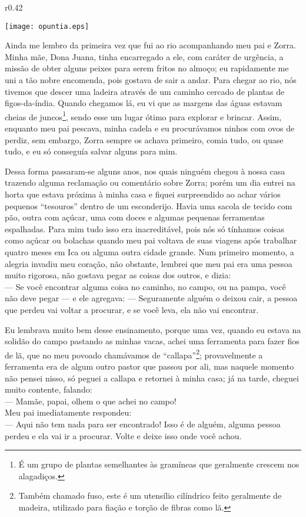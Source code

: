 \ifdefined\EnableIncludeImages
\begin{wrapfigure}{r}{0.42\textwidth}
  \begin{center}
  \vspace{-30pt}
    \texttt{[image: opuntia.eps]}
  \end{center}
  \vspace{-20pt}
\end{wrapfigure}
\fi
Ainda me lembro da primeira vez que fui ao rio acompanhando meu pai e Zorra. Minha mãe, Dona Juana, tinha encarregado a ele, com caráter de urgência, a missão de obter alguns peixes para serem fritos no almoço; eu rapidamente me uni a tão nobre encomenda, pois gostava de sair a andar. 
Para chegar ao rio, nós tivemos que descer uma ladeira através de um caminho cercado de plantas de figos-da-índia. Quando chegamos lá, eu vi que as margens das águas estavam cheias de juncos\footnote{É um grupo de plantas semelhantes às gramíneas que geralmente crescem nos alagadiços.}, sendo esse um lugar ótimo para explorar e brincar. Assim, enquanto meu pai pescava, minha cadela e eu procurávamos ninhos com ovos de perdiz, sem embargo, Zorra sempre os achava primeiro, comia tudo, ou quase tudo, e eu só conseguía salvar alguns para mim.


Dessa forma passaram-se alguns anos, nos quais ninguém chegou à nossa casa trazendo alguma reclamação ou comentário sobre Zorra; porém um dia entrei na horta que estava próxima à minha casa e fiquei surpreendido ao achar vários pequenos ``tesouros'' dentro de um esconderijo. Havia uma sacola de tecido com pão, outra com açúcar, uma com doces e algumas pequenas ferramentas espalhadas. 
Para mim tudo isso era inacreditável, pois nós só tínhamos coisas como açúcar ou bolachas quando meu pai voltava de suas viagens após trabalhar quatro meses em Ica ou alguma outra cidade grande.
Num primeiro momento, a alegria invadiu meu coração, não obstante, lembrei que meu pai era uma pessoa muito rigorosa, não gostava pegar as coisas dos outros, e dizia:\\\indent
--- Se você encontrar alguma coisa no caminho, no campo, ou na pampa, você não deve pegar ---
e ele agregava:
--- Seguramente alguém o deixou cair, a pessoa que perdeu vai voltar a procurar, e se você leva, ela não vai encontrar.

Eu lembrava muito bem desse ensinamento, porque uma vez, quando eu estava na solidão do campo pastando as minhas vacas, achei uma ferramenta para fazer fios de lã, que no meu povoado chamávamos de ``callapa''\footnote{Também chamado fuso, este é um utensílio cilíndrico feito geralmente de madeira, utilizado para fiação e torção de fibras como lã.}; provavelmente a ferramenta era de algum outro pastor que passou por ali, mas naquele momento não pensei nisso, só peguei a callapa e retornei à minha casa; já na tarde, cheguei  muito contente, falando:\\\indent
--- Mamãe, papai, olhem o que achei no campo!\\\indent
Meu pai imediatamente respondeu:\\\indent
--- Aqui não tem nada para ser encontrado! Isso é de alguém, alguma pessoa perdeu e ela vai ir a procurar. Volte e deixe isso onde você achou.

